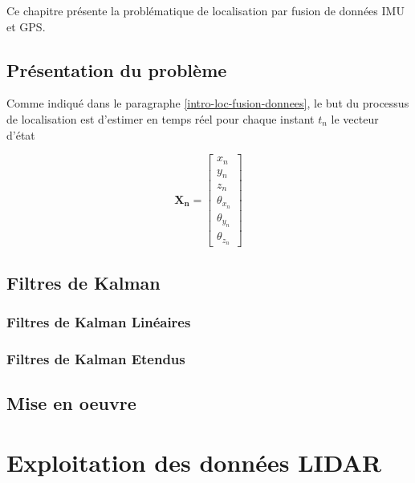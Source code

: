 \documentclass[12pt,a4paper]{report}
\begin{document}
Ce chapitre présente la problématique de localisation par fusion de données IMU et GPS.

	\section{Présentation du problème}
	Comme indiqué dans le paragraphe \ref{intro-loc-fusion-donnees}, le but du processus de localisation est d'estimer en temps réel pour chaque instant $t_n$ le vecteur d'état 
	
	\begin{equation}
	\mathbf{X_n} = \begin{bmatrix}
	x_n \\ y_n \\ z_n \\ \theta_{x_n} \\ \theta_{y_n} \\ \theta_{z_n}
	\end{bmatrix}
	\end{equation}
	
	
	\section{Filtres de Kalman}
	
	\subsection{Filtres de Kalman Linéaires}
	
	\subsection{Filtres de Kalman Etendus}
	
	\section{Mise en oeuvre}
	
	
	
\chapter{Exploitation des données LIDAR}
\end{document}
